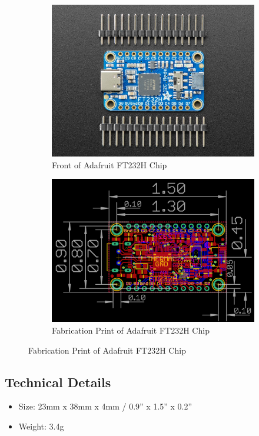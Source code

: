 \documentclass[11pt, oneside]{article}   	%
\begin{document}
\begin{figure}[ht]
\centering
\begin{subfigure}[b]{0.4\textwidth}
\includegraphics[width=\textwidth]{imgs/ft232h_front.jpeg}
\caption{Front of Adafruit FT232H Chip}
\end{subfigure}
\begin{subfigure}[b]{0.425\textwidth}
\includegraphics[width=\textwidth]{imgs/ft232h_fab_print.png}
\caption{Fabrication Print of Adafruit FT232H Chip}
\end{subfigure}
\end{figure}

\subsection{Technical Details}
\begin{itemize}
\item Size: 23mm x 38mm x 4mm / 0.9'' x 1.5'' x 0.2''
\item Weight: 3.4g
\end{itemize}
\end{document}
